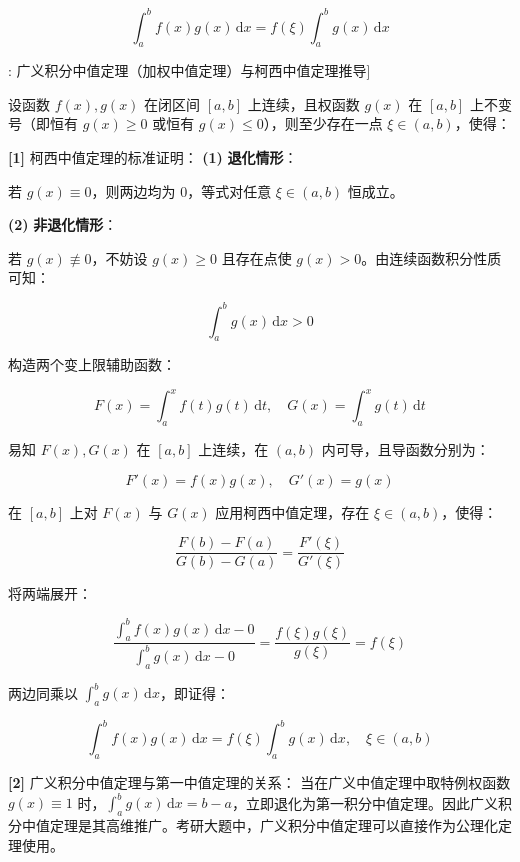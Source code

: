 \documentclass[11pt,a4paper,UTF8]{ctexart}
\begin{document}
\begin{equation*}
\int_a^b f(x)g(x)\,\mathrm{d}x = f(\xi)\int_a^b g(x)\,\mathrm{d}x
\end{equation*}
\begin{thmbox}[定理[2]: 广义积分中值定理（加权中值定理）与柯西中值定理推导]

设函数 $f(x), g(x)$ 在闭区间 $[a, b]$ 上连续，且权函数 $g(x)$ 在 $[a, b]$ 上不变号（即恒有 $g(x) \geqslant 0$ 或恒有 $g(x) \leqslant 0$），则至少存在一点 $\xi \in (a, b)$，使得：


\textbf{[1]} 柯西中值定理的标准证明：
\textbf{(1)}  \textbf{退化情形}：

若 $g(x) \equiv 0$，则两边均为 0，等式对任意 $\xi \in (a, b)$ 恒成立。

\textbf{(2)}  \textbf{非退化情形}：

若 $g(x) \not\equiv 0$，不妨设 $g(x) \geqslant 0$ 且存在点使 $g(x) > 0$。由连续函数积分性质可知：


\begin{equation*}
\int_a^b g(x)\,\mathrm{d}x > 0
\end{equation*}


构造两个变上限辅助函数：


\begin{equation*}
F(x) = \int_a^x f(t)g(t)\,\mathrm{d}t, \quad G(x) = \int_a^x g(t)\,\mathrm{d}t
\end{equation*}


易知 $F(x), G(x)$ 在 $[a, b]$ 上连续，在 $(a, b)$ 内可导，且导函数分别为：


\begin{equation*}
F'(x) = f(x)g(x), \quad G'(x) = g(x)
\end{equation*}


在 $[a, b]$ 上对 $F(x)$ 与 $G(x)$ 应用柯西中值定理，存在 $\xi \in (a, b)$，使得：


\begin{equation*}
\frac{F(b) - F(a)}{G(b) - G(a)} = \frac{F'(\xi)}{G'(\xi)}
\end{equation*}


将两端展开：


\begin{equation*}
\frac{\int_a^b f(x)g(x)\,\mathrm{d}x - 0}{\int_a^b g(x)\,\mathrm{d}x - 0} = \frac{f(\xi)g(\xi)}{g(\xi)} = f(\xi)
\end{equation*}


两边同乘以 $\int_a^b g(x)\,\mathrm{d}x$，即证得：


\begin{equation*}
\int_a^b f(x)g(x)\,\mathrm{d}x = f(\xi)\int_a^b g(x)\,\mathrm{d}x, \quad \xi \in (a, b)
\end{equation*}


\textbf{[2]} 广义积分中值定理与第一中值定理的关系：
当在广义中值定理中取特例权函数 $g(x) \equiv 1$ 时，$\int_a^b g(x)\,\mathrm{d}x = b - a$，立即退化为第一积分中值定理。因此广义积分中值定理是其高维推广。考研大题中，广义积分中值定理可以直接作为公理化定理使用。

\end{thmbox}
\end{document}
